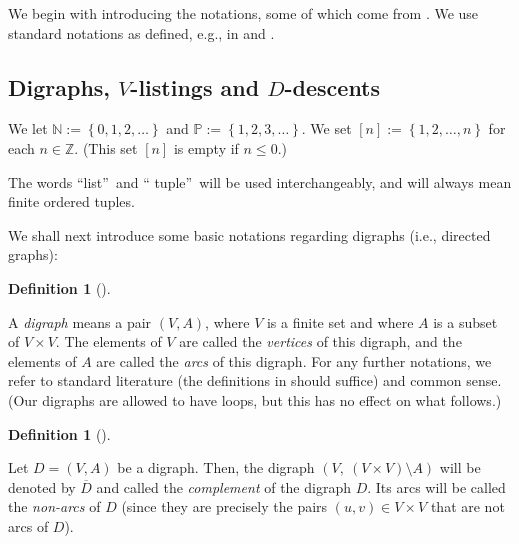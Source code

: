 \documentclass[numbers=enddot,12pt,final,onecolumn,notitlepage]{scrartcl}%
\numberwithin{exer}{section}
\theoremstyle{definition}
\newtheorem{defi}[theo]{Definition}
\newenvironment{definition}[1][]
{\begin{defi}[#1]\begin{leftbar}}
{\end{leftbar}\end{defi}}
\begin{document}
We begin with introducing the notations, some of which come from \cite[Problem
120]{EC2supp}. We use standard notations as defined, e.g., in \cite[Chapter
7]{EC2} and \cite[Chapters 2 and 5]{GriRei}.

\subsection{Digraphs, $V$-listings and $D$-descents}

We let $\mathbb{N}:=\left\{  0,1,2,\ldots\right\}  $ and $\mathbb{P}:=\left\{
1,2,3,\ldots\right\}  $. We set $\left[  n\right]  :=\left\{  1,2,\ldots
,n\right\}  $ for each $n\in\mathbb{Z}$. (This set $\left[  n\right]  $ is
empty if $n\leq0$.)

The words \textquotedblleft list\textquotedblright\ and \textquotedblleft
tuple\textquotedblright\ will be used interchangeably, and will always mean
finite ordered tuples.

We shall next introduce some basic notations regarding digraphs (i.e.,
directed graphs):

\begin{definition}
A \emph{digraph} means a pair $\left(  V,A\right)  $, where $V$ is a finite
set and where $A$ is a subset of $V\times V$. The elements of $V$ are called
the \emph{vertices} of this digraph, and the elements of $A$ are called the
\emph{arcs} of this digraph. For any further notations, we refer to standard
literature (the definitions in \cite[\S 1.1-\S 1.2]{17s-lec7} should suffice)
and common sense. (Our digraphs are allowed to have loops, but this has no
effect on what follows.)
\end{definition}

\begin{definition}
Let $D=\left(  V,A\right)  $ be a digraph. Then, the digraph $\left(
V,\ \left(  V\times V\right)  \setminus A\right)  $ will be denoted by
$\overline{D}$ and called the \emph{complement} of the digraph $D$. Its arcs
will be called the \emph{non-arcs} of $D$ (since they are precisely the pairs
$\left(  u,v\right)  \in V\times V$ that are not arcs of $D$).
\end{definition}

\Needspace{18pc}
\end{document}
